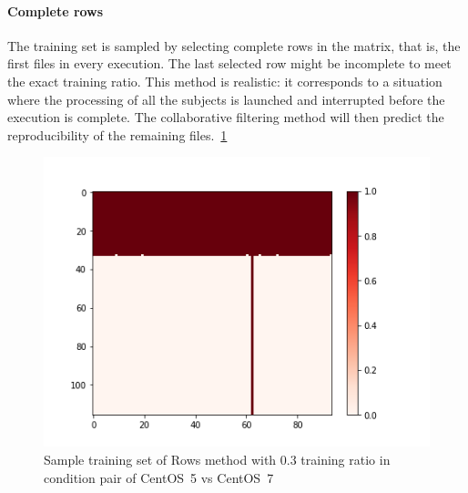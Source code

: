 \documentclass[10pt, conference, compsocconf]{IEEEtran}
\begin{document}
\paragraph{Complete rows} The training set is sampled by selecting complete 
rows in the matrix, that is, the first files in
every execution. The last selected row might be incomplete to meet the
exact training ratio. This method is realistic: it corresponds to a
situation where the processing of all the subjects is launched and
interrupted before the execution is complete. The collaborative 
filtering method will then predict the reproducibility of the
remaining files.~\ref{fig:Rows-Sample-Training-set}
\begin{figure}
  \includegraphics[width=\columnwidth]{figures/5vs7_rows_03_training}
  \caption{Sample training set of Rows method with 0.3 training ratio in condition pair of CentOS~5 vs CentOS~7}
  \label{fig:Rows-Sample-Training-set}
\end{figure}

\end{document}
